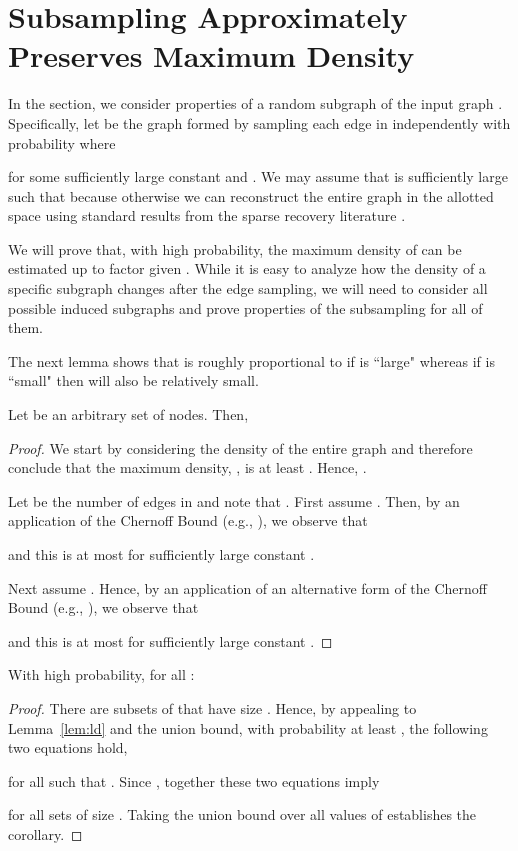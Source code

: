 \documentclass[11pt]{article}
\begin{document}
\section{Subsampling Approximately Preserves Maximum Density}\label{sec:subsample}
In the section, we consider properties of a random subgraph of the input graph .
Specifically, let  be the graph formed by sampling each edge in  independently with probability  where

for some sufficiently large constant  and . We may assume that  is sufficiently large such that  because otherwise we can reconstruct the entire graph in the allotted space using standard results from the sparse recovery literature \cite{GilbertI10}. 


We will prove that, with high probability, the maximum density  of  can be estimated up to factor  given . While it is easy to analyze how the density of a specific subgraph changes after the edge sampling, we will need to consider all  possible induced subgraphs and prove properties of the subsampling for all of them. 

The next lemma shows that  is roughly proportional to  if  is ``large" whereas if  is ``small" then  will also be relatively small.

\begin{lemma}
\label{lem:ld}
Let  be an arbitrary set of  nodes. Then, 


\end{lemma}
\begin{proof}
We start by considering the density of the entire graph  and therefore conclude that the maximum density, , is at least . Hence, .



Let  be the number of edges in  and note that . First assume . Then, by an application of the Chernoff Bound (e.g., \cite[Theorem 4.4]{MitzenmacherE05}), we observe that

and this is at most  for sufficiently large constant . 

Next assume . Hence, by an application of an alternative form of the Chernoff Bound (e.g., \cite[Theorem 4.4 and 4.5]{MitzenmacherE05}), we observe that

and this is at most  for sufficiently large constant .
\end{proof}

\begin{corollary}
\label{cor:ld}
With high probability, for all :

\end{corollary}
\begin{proof}
There are  subsets of  that have size . Hence, by appealing to Lemma~\ref{lem:ld} and the union bound, with probability at least , the following two equations hold,

for all  such that . Since  , together these two equations imply 

for all sets  of size . Taking the union bound over all values of  establishes the corollary.\end{proof}
\end{document}
